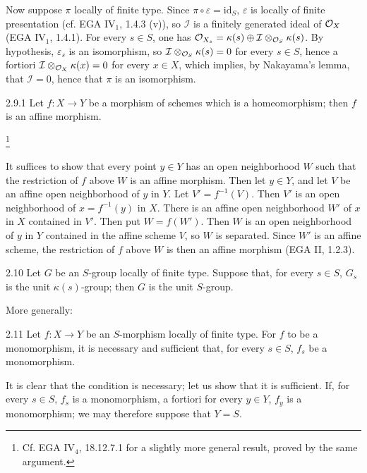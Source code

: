 Now suppose $\pi$ locally of finite type. Since $\pi\circ\varepsilon=\mathrm{id}_S$, $\varepsilon$ is locally of finite presentation (cf. EGA IV$_1$, 1.4.3 (v)), so $\mathcal I$ is a finitely generated ideal of $\mathcal{O}_X$ (EGA IV$_1$, 1.4.1). For every $s\in S$, one has $\mathcal{O}_{X_s}=\kappa(s)\oplus\mathcal I\otimes_{\mathcal{O}_S}\kappa(s)$. By hypothesis, $\varepsilon_s$ is an isomorphism, so $\mathcal I\otimes_{\mathcal{O}_S}\kappa(s)=0$ for every $s\in S$, hence a fortiori $\mathcal I\otimes_{\mathcal{O}_X}\kappa(x)=0$ for every $x\in X$, which implies, by Nakayama's lemma, that $\mathcal I=0$, hence that $\pi$ is an isomorphism.
\begin{lemma}{2.9.1}\label{VIB.2.9.1}
Let $f:X\to Y$ be a morphism of schemes which is a homeomorphism; then $f$ is an affine morphism.\begingroup\renewcommand{\thefootnote}{***}\addtocounter{footnote}{-1}\footnote{Cf. EGA IV$_4$, 18.12.7.1 for a slightly more general result, proved by the same argument.}\endgroup
\end{lemma}
It suffices to show that every point $y\in Y$ has an open neighborhood $W$ such that the restriction of $f$ above $W$ is an affine morphism. Then let $y\in Y$, and let $V$ be an affine open neighborhood of $y$ in $Y$. Let $V'=f^{-1}(V)$. Then $V'$ is an open neighborhood of $x=f^{-1}(y)$ in $X$. There is an affine open neighborhood $W'$ of $x$ in $X$ contained in $V'$. Then put $W=f(W')$. Then $W$ is an open neighborhood of $y$ in $Y$ contained in the affine scheme $V$, so $W$ is separated. Since $W'$ is an affine scheme, the restriction of $f$ above $W$ is then an affine morphism (EGA II, 1.2.3).
\begin{corollary}{2.10}\label{VIB.2.10}
Let $G$ be an $S$-group locally of finite type. Suppose that, for every $s\in S$, $G_s$ is the unit $\kappa(s)$-group; then $G$ is the unit $S$-group.
\end{corollary}
More generally:
\begin{corollary}{2.11}\label{VIB.2.11}
Let $f:X\to Y$ be an $S$-morphism locally of finite type. For $f$ to be a monomorphism, it is necessary and sufficient that, for every $s\in S$, $f_s$ be a monomorphism.
\end{corollary}
It is clear that the condition is necessary; let us show that it is sufficient. If, for every $s\in S$, $f_s$ is a monomorphism, a fortiori for every $y\in Y$, $f_y$ is a monomorphism; we may therefore suppose that $Y=S$.

